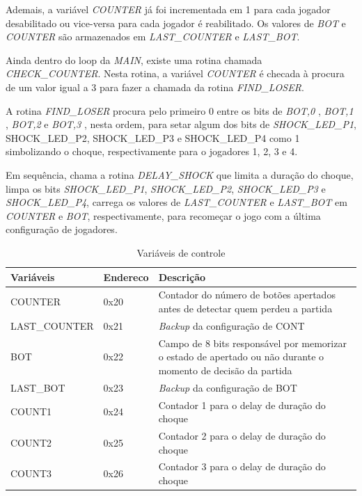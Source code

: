 \documentclass[article]{IEEEtran}
\begin{document}
Ademais, a variável \textit{COUNTER} já foi incrementada em 1 para cada jogador desabilitado ou vice-versa para cada jogador é reabilitado. Os valores de \textit{BOT} e \textit{COUNTER} são armazenados em \textit{LAST\_COUNTER} e \textit{LAST\_BOT}. 

Ainda dentro do loop da \textit{MAIN}, existe uma rotina chamada \textit{CHECK\_COUNTER}. Nesta rotina, a variável \textit{COUNTER} é checada à procura de um valor igual a 3 para fazer a chamada da rotina \textit{FIND\_LOSER}.

A rotina \textit{FIND\_LOSER} procura pelo primeiro 0 entre os bits de \textit{BOT,0} , \textit{BOT,1} , \textit{BOT,2} e \textit{BOT,3} , nesta ordem, para setar algum dos bits de \textit{SHOCK\_LED\_P1}, {SHOCK\_LED\_P2}, {SHOCK\_LED\_P3} e {SHOCK\_LED\_P4} como 1 simbolizando o choque, respectivamente para o jogadores 1, 2, 3 e 4.

Em sequência, chama a rotina \textit{DELAY\_SHOCK} que limita a duração do choque, limpa os bits \textit{SHOCK\_LED\_P1}, \textit{SHOCK\_LED\_P2}, \textit{SHOCK\_LED\_P3} e \textit{SHOCK\_LED\_P4}, carrega os valores de \textit{LAST\_COUNTER} e \textit{LAST\_BOT} em \textit{COUNTER} e \textit{BOT}, respectivamente, para recomeçar o jogo com a última configuração de jogadores.

\begin{table}
  \centering
  \caption{Variáveis de controle}
  \vspace{0.5cm}
  \label{tab:variaveis}
  \begin{tabular}{|p{2cm}|p{1cm}|p{3.3cm}|} \hline
    Variáveis 		& Endereco & Descrição 						\\ \hline
    COUNTER		& 0x20	   & Contador do número de botões apertados antes
				     de detectar quem perdeu a partida			\\ \hline
    LAST\_COUNTER	& 0x21	   & \textit{Backup} da configuração de CONT		\\ \hline
    BOT			& 0x22	   & Campo de 8 bits responsável por memorizar
				    		 o estado de apertado ou não durante o 
				     		 momento de decisão da partida			\\ \hline
    LAST\_BOT	& 0x23	   & \textit{Backup} da configuração de BOT 		\\ \hline  
    COUNT1		& 0x24	   & Contador 1 para o delay de duração do choque	\\ \hline
    COUNT2		& 0x25	   & Contador 2 para o delay de duração do choque	\\ \hline
    COUNT3		& 0x26	   & Contador 3 para o delay de duração do choque	\\ \hline
  \end{tabular}
\end{table}
\end{document}
